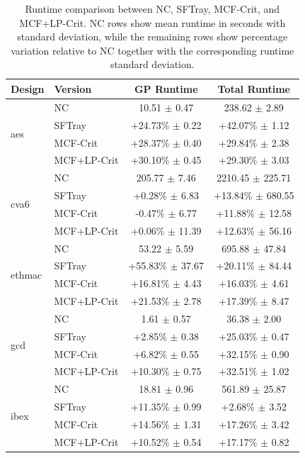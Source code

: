 \begin{table}[t]
\centering
\caption{Runtime comparison between NC, SFTray, MCF-Crit, and MCF+LP-Crit. NC rows show mean runtime in seconds with standard deviation, while the remaining rows show percentage variation relative to NC together with the corresponding runtime standard deviation.}
\label{tab:runtime_results}
\scriptsize
\setlength{\tabcolsep}{3pt}
\begin{tabular}{llcc}
\toprule
Design & Version & GP Runtime & Total Runtime \\
\midrule
\multirow{4}{*}{aes} & NC & 10.51 $\pm$ 0.47 & 238.62 $\pm$ 2.89 \\
 & SFTray & +24.73\% $\pm$ 0.22 & +42.07\% $\pm$ 1.12 \\
 & MCF-Crit & +28.37\% $\pm$ 0.40 & +29.84\% $\pm$ 2.38 \\
 & MCF+LP-Crit & +30.10\% $\pm$ 0.45 & +29.30\% $\pm$ 3.03 \\
\midrule
\multirow{4}{*}{cva6} & NC & 205.77 $\pm$ 7.46 & 2210.45 $\pm$ 225.71 \\
 & SFTray & +0.28\% $\pm$ 6.83 & +13.84\% $\pm$ 680.55 \\
 & MCF-Crit & -0.47\% $\pm$ 6.77 & +11.88\% $\pm$ 12.58 \\
 & MCF+LP-Crit & +0.06\% $\pm$ 11.39 & +12.63\% $\pm$ 56.16 \\
\midrule
\multirow{4}{*}{ethmac} & NC & 53.22 $\pm$ 5.59 & 695.88 $\pm$ 47.84 \\
 & SFTray & +55.83\% $\pm$ 37.67 & +20.11\% $\pm$ 84.44 \\
 & MCF-Crit & +16.81\% $\pm$ 4.43 & +16.03\% $\pm$ 4.61 \\
 & MCF+LP-Crit & +21.53\% $\pm$ 2.78 & +17.39\% $\pm$ 8.47 \\
\midrule
\multirow{4}{*}{gcd} & NC & 1.61 $\pm$ 0.57 & 36.38 $\pm$ 2.00 \\
 & SFTray & +2.85\% $\pm$ 0.38 & +25.03\% $\pm$ 0.47 \\
 & MCF-Crit & +6.82\% $\pm$ 0.55 & +32.15\% $\pm$ 0.90 \\
 & MCF+LP-Crit & +10.30\% $\pm$ 0.75 & +32.51\% $\pm$ 1.02 \\
\midrule
\multirow{4}{*}{ibex} & NC & 18.81 $\pm$ 0.96 & 561.89 $\pm$ 25.87 \\
 & SFTray & +11.35\% $\pm$ 0.99 & +2.68\% $\pm$ 3.52 \\
 & MCF-Crit & +14.56\% $\pm$ 1.31 & +17.26\% $\pm$ 3.42 \\
 & MCF+LP-Crit & +10.52\% $\pm$ 0.54 & +17.17\% $\pm$ 0.82 \\

\end{tabular}
\end{table}
